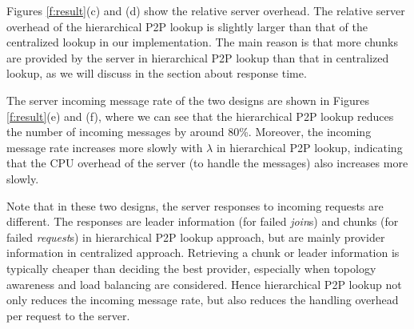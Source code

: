     Figures \ref{f:result}(c) and (d) show the relative server
    overhead.
    The relative server overhead of the hierarchical P2P lookup is
    slightly larger than that of the centralized lookup in our
    implementation. The main reason is that more chunks are provided
    by the server in hierarchical P2P lookup than that in centralized
    lookup, as we will discuss in the section about response time.%

    The server incoming message rate of the two designs are shown in
    Figures \ref{f:result}(e) and (f), where we can see that 
    the hierarchical P2P lookup reduces the number of incoming
    messages by around
    80\%. Moreover, the incoming message rate increases more slowly with
    $\lambda$ in hierarchical P2P lookup, indicating that 
    the CPU overhead of the server (to handle the messages) also 
	increases more slowly.

    Note that in these two designs, the server responses to incoming
    requests are different. The responses are leader
    information (for failed \emph{join}s) and chunks (for failed
    \emph{request}s) in hierarchical P2P lookup approach, but are
    mainly provider information in centralized approach. 
    Retrieving a chunk or leader information is typically
    cheaper than deciding the best provider, especially when
    topology awareness and load balancing are considered. Hence 
    hierarchical P2P lookup not only reduces the incoming message rate, but
    also reduces the handling overhead per request to the server.
    

